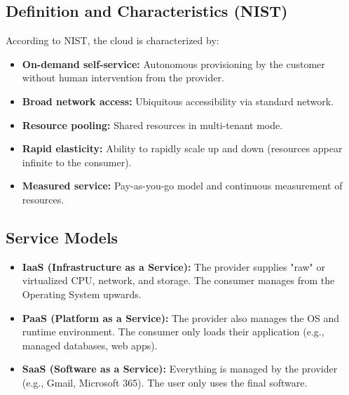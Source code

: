 \subsection{Definition and Characteristics (NIST)}
According to NIST, the cloud is characterized by:
\begin{itemize}
    \item \textbf{On-demand self-service:} Autonomous provisioning by the customer without human intervention from the provider.
    \item \textbf{Broad network access:} Ubiquitous accessibility via standard network.
    \item \textbf{Resource pooling:} Shared resources in multi-tenant mode.
    \item \textbf{Rapid elasticity:} Ability to rapidly scale up and down (resources appear infinite to the consumer).
    \item \textbf{Measured service:} Pay-as-you-go model and continuous measurement of resources.
\end{itemize}

\subsection{Service Models}
\begin{itemize}
    \item \textbf{IaaS (Infrastructure as a Service):} The provider supplies "raw" or virtualized CPU, network, and storage. The consumer manages from the Operating System upwards.
    \item \textbf{PaaS (Platform as a Service):} The provider also manages the OS and runtime environment. The consumer only loads their application (e.g., managed databases, web apps).
    \item \textbf{SaaS (Software as a Service):} Everything is managed by the provider (e.g., Gmail, Microsoft 365). The user only uses the final software.
\end{itemize}

